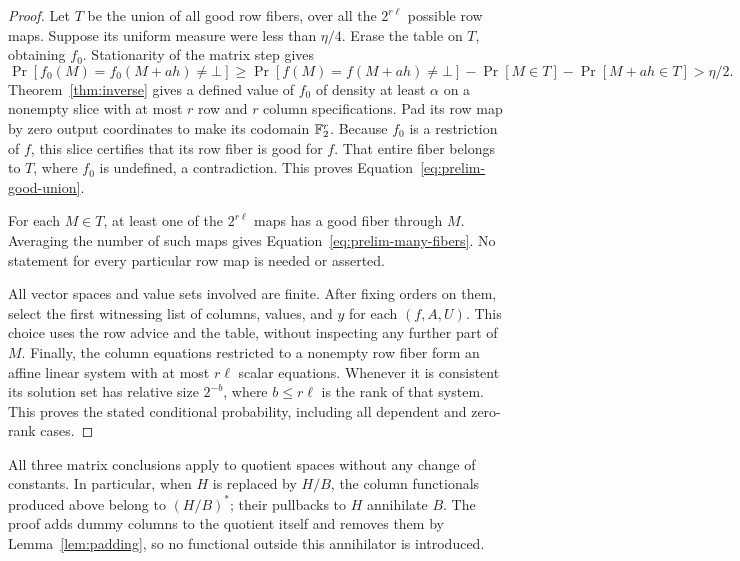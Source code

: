 \begin{proof}
Let $T$ be the union of all good row fibers, over all the
$2^{r\ell}$ possible row maps.  Suppose its uniform measure were
less than $\eta/4$.  Erase the table on $T$, obtaining $f_0$.
Stationarity of the matrix step gives
\[
 \Pr[f_0(M)=f_0(M+ah)\ne\bot]
 \geq \Pr[f(M)=f(M+ah)\ne\bot]
          -\Pr[M\in T]-\Pr[M+ah\in T]
 >\eta/2.
\]
Theorem~\ref{thm:inverse} gives a defined value of $f_0$ of density
at least $\alpha$ on a nonempty slice with at most $r$ row and $r$
column specifications.  Pad its row map by zero output coordinates
to make its codomain $\mathbb F_2^r$.  Because $f_0$ is a restriction of
$f$, this slice certifies that its row fiber is good for $f$.
That entire fiber belongs to $T$, where $f_0$ is undefined, a
contradiction.  This proves Equation~\eqref{eq:prelim-good-union}.

For each $M\in T$, at least one of the $2^{r\ell}$ maps has a
good fiber through $M$.  Averaging the number of such maps gives
Equation~\eqref{eq:prelim-many-fibers}.  No statement for every
particular row map is needed or asserted.

All vector spaces and value sets involved are finite.  After fixing
orders on them, select the first witnessing list of columns, values,
and $y$ for each $(f,A,U)$.  This choice uses the row advice and
the table, without inspecting any further part of $M$.
Finally, the column equations restricted to a nonempty row fiber form
an affine linear system with at most $r\ell$ scalar equations.
Whenever it is consistent its solution set has relative size
$2^{-b}$, where $b\leq r\ell$ is the rank of that system.  This
proves the stated conditional probability, including all dependent
and zero-rank cases.
\end{proof}

All three matrix conclusions apply to quotient spaces without any
change of constants.  In particular, when $H$ is replaced by $H/B$,
the column functionals produced above belong to $(H/B)^*$; their
pullbacks to $H$ annihilate $B$.  The proof adds dummy columns to the
quotient itself and removes them by Lemma~\ref{lem:padding}, so no
functional outside this annihilator is introduced.
